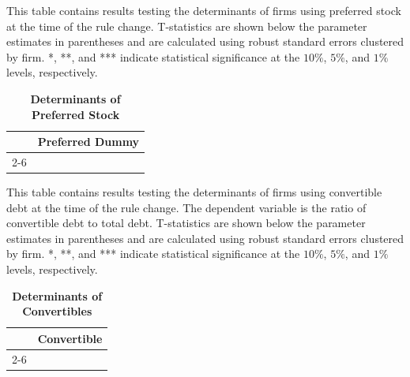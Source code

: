 \documentclass[a4paper, 12pt]{article}
\begin{document}
\newpage


\begin{table}[htbp]
\caption{\textbf{Determinants of Preferred Stock}} \label{table_prefdet}
\begin{singlespace}
\begin{small}

\noindent This table contains results testing the determinants of firms using preferred stock at the time of the rule change. T-statistics are shown below the parameter estimates in parentheses and are calculated using robust standard errors clustered by firm. *, **, and *** indicate statistical significance at the $10\%$, $5\%$, and $1\%$ levels, respectively.

\end{small}
\end{singlespace}
\vspace{3mm}
\small
  \centering
    \begin{tabular}{lccccc}
    \toprule
    \textbf{ } &
      \multicolumn{5}{c}{\textbf{Preferred Dummy}}
      \\
      \cline{2-6}

  


    \bottomrule
    \end{tabular}
\end{table}
\clearpage

\newpage


\begin{table}[htbp]
\caption{\textbf{Determinants of Convertibles}} \label{table_convdet}
\begin{singlespace}
\begin{small}

\noindent This table contains results testing the determinants of firms using convertible debt at the time of the rule change. The dependent variable is the ratio of convertible debt to total debt. T-statistics are shown below the parameter estimates in parentheses and are calculated using robust standard errors clustered by firm. *, **, and *** indicate statistical significance at the $10\%$, $5\%$, and $1\%$ levels, respectively.

\end{small}
\end{singlespace}
\vspace{3mm}
\small
  \centering
    \begin{tabular}{lccccc}
    \toprule
    \textbf{ } &
      \multicolumn{5}{c}{\textbf{Convertible}}
      \\
      \cline{2-6}

  


    \bottomrule
    \end{tabular}
\end{table}
\clearpage
\end{document}
